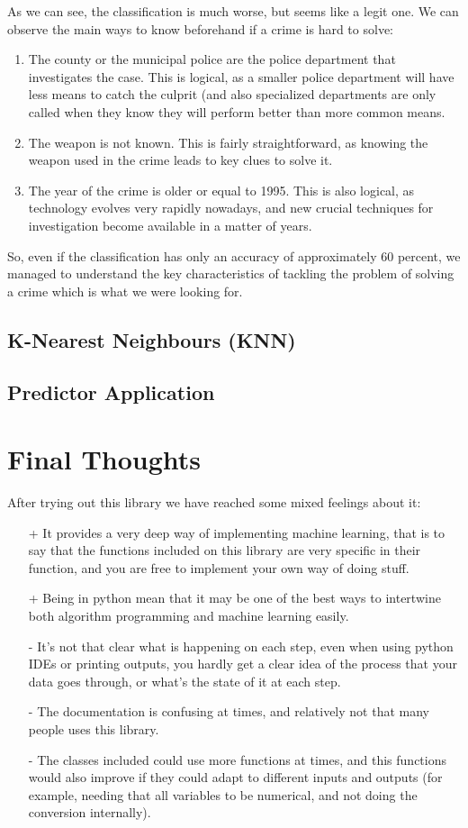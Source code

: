 \documentclass[12pt]{report}
\begin{document}
As we can see, the classification is much worse, but seems like a legit one. We can observe the main ways to know beforehand if a crime is hard to solve:
\begin{enumerate}
\item The county or the municipal police are the police department that investigates the case. This is logical, as a smaller police department will have less means to catch the culprit (and also specialized departments are only called when they know they will perform better than more common means.
\item The weapon is not known. This is fairly straightforward, as knowing the weapon used in the crime leads to key clues to solve it.
\item The year of the crime is older or equal to 1995. This is also logical, as technology evolves very rapidly nowadays, and new crucial techniques for investigation become available in a matter of years.
\end{enumerate}

So, even if the classification has only an accuracy of approximately 60 percent, we managed to understand the key characteristics of tackling the problem of solving a crime which is what we were looking for.

\subsection{K-Nearest Neighbours (KNN)}

\subsection{Predictor Application}

\section{Final Thoughts} 
After trying out this library we have reached some mixed feelings about it:
\begin{itemize}
\item[+] It provides a very deep way of implementing machine learning, that is to say that the functions included on this library are very specific in their function, and you are free to implement your own way of doing stuff.
\item[+] Being in python mean that it may be one of the best ways to intertwine both algorithm programming and machine learning easily.
\item[-] It's not that clear what is happening on each step, even when using python IDEs or printing outputs, you hardly get a clear idea of the process that your data goes through, or what's the state of it at each step.
\item[-] The documentation is confusing at times, and relatively not that many people uses this library.
\item[-] The classes included could use more functions at times, and this functions would also improve if they could adapt to different inputs and outputs (for example, needing that all variables to be numerical, and not doing the conversion internally).
\end{itemize}
\end{document}
